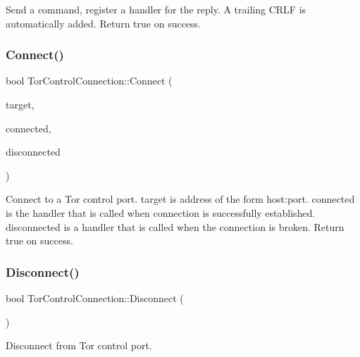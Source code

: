 Send a command, register a handler for the reply. A trailing C\+R\+LF is automatically added. Return true on success. \mbox{\label{class_tor_control_connection_a36b6359caf9a304efe310b9b7141a939}} 
\subsubsection{\texorpdfstring{Connect()}{Connect()}}
{\footnotesize\ttfamily bool Tor\+Control\+Connection\+::\+Connect (\begin{DoxyParamCaption}\item[{const std\+::string \&}]{target,  }\item[{const \mbox{\hyperlink{class_tor_control_connection_a30ec1d9f7e35720dc435e555e212ad73}{Connection\+CB}} \&}]{connected,  }\item[{const \mbox{\hyperlink{class_tor_control_connection_a30ec1d9f7e35720dc435e555e212ad73}{Connection\+CB}} \&}]{disconnected }\end{DoxyParamCaption})}

Connect to a Tor control port. target is address of the form host\+:port. connected is the handler that is called when connection is successfully established. disconnected is a handler that is called when the connection is broken. Return true on success. \mbox{\label{class_tor_control_connection_addb42114063641eab12be2fc39b859d5}} 
\subsubsection{\texorpdfstring{Disconnect()}{Disconnect()}}
{\footnotesize\ttfamily bool Tor\+Control\+Connection\+::\+Disconnect (\begin{DoxyParamCaption}{ }\end{DoxyParamCaption})}

Disconnect from Tor control port. \mbox{\label{class_tor_control_connection_a8b22b26822247f8be7d739e14a045e98}} 
